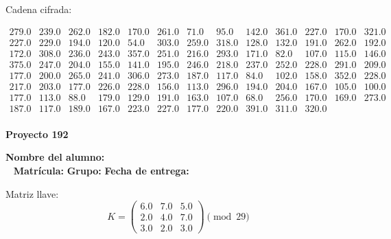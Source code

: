 \documentclass[12pt]{article}
\begin{document}
Cadena cifrada:
\begin{center}
$\begin{array}{lllllllllllll}
279.0 & 239.0 & 262.0 & 182.0 & 170.0 & 261.0 & 71.0 & 95.0 & 142.0 & 361.0 & 227.0 & 170.0 & 321.0\\
227.0 & 229.0 & 194.0 & 120.0 & 54.0 & 303.0 & 259.0 & 318.0 & 128.0 & 132.0 & 191.0 & 262.0 & 192.0\\
172.0 & 308.0 & 236.0 & 243.0 & 357.0 & 251.0 & 216.0 & 293.0 & 171.0 & 82.0 & 107.0 & 115.0 & 146.0\\
375.0 & 247.0 & 204.0 & 155.0 & 141.0 & 195.0 & 246.0 & 218.0 & 237.0 & 252.0 & 228.0 & 291.0 & 209.0\\
177.0 & 200.0 & 265.0 & 241.0 & 306.0 & 273.0 & 187.0 & 117.0 & 84.0 & 102.0 & 158.0 & 352.0 & 228.0\\
217.0 & 203.0 & 177.0 & 226.0 & 228.0 & 156.0 & 113.0 & 296.0 & 194.0 & 204.0 & 167.0 & 105.0 & 100.0\\
177.0 & 113.0 & 88.0 & 179.0 & 129.0 & 191.0 & 163.0 & 107.0 & 68.0 & 256.0 & 170.0 & 169.0 & 273.0\\
187.0 & 117.0 & 189.0 & 167.0 & 223.0 & 227.0 & 177.0 & 220.0 & 391.0 & 311.0 & 320.0\\
\end{array}$
\end{center}

\newpage


\textbf{Proyecto 192}

\textbf{Nombre del alumno:} \underline{\hspace{13cm}}\\\
\vspace{1cm}
\textbf{Matrícula:} \underline{\hspace{4cm}} \hspace{1cm}
\textbf{Grupo:} \underline{\hspace{2cm}}
\textbf{Fecha de entrega:} \underline{\hspace{2cm}}

\medskip

Matriz llave:
\[
K = \begin{pmatrix}
6.0 & 7.0 & 5.0\\
2.0 & 4.0 & 7.0\\
3.0 & 2.0 & 3.0
\end{pmatrix} \pmod{29}
\]
\end{document}
